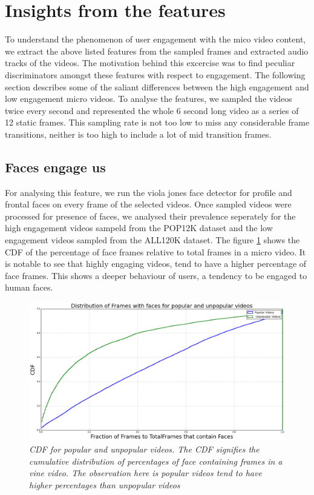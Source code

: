 \section{Insights from the features}
To understand the phenomenon of user engagement with the mico video content, we extract the above listed features from the sampled frames and extracted audio tracks of the videos. The motivation behind this excercise was to find peculiar discriminators amongst these features with respect to engagement. The following section describes some of the saliant differences between the high engagement and low engagement micro videos. To analyse the features, we sampled the videos twice every second and represented the whole 6 second long video as a series of 12 static frames. This sampling rate is not too low to miss any considerable frame transitions, neither is too high to include a lot of mid transition frames. 

\subsection{Faces engage us}
For analysing this feature, we run the viola jones face detector for profile and frontal faces on every frame of the selected videos. Once sampled videos were processed for presence of faces, we analysed their prevalence seperately for the high engagement videos sampeld from the POP12K dataset and the low engagement videos sampled from the ALL120K dataset. The figure \ref{fig:Face_CDF} shows the CDF of the percentage of face frames relative to total frames in a micro video. It is notable to see that highly engaging videos, tend to have a higher percentage of face frames. This shows a deeper behaviour of users, a tendency to be engaged to human faces. 

\begin{figure}[!htb]
\centering
\includegraphics[width=\columnwidth]{plots/FaceCDF}
\caption{\textsl{ CDF for popular and unpopular videos. The CDF signifies the cumulative distribution of percentages of face containing frames in a vine video. The observation here is popular videos tend to have higher percentages than unpopular videos}}
\label{fig:Face_CDF}
\end{figure}

